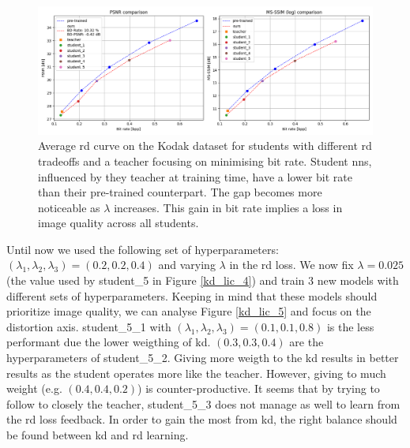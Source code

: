 \documentclass{article}
\begin{document}
\begin{figure}
    \centering
    \includegraphics[width=15cm]{kd_lic_rd_lambda_2.png}
    \caption[Average \acrshort{rd} curve on the Kodak dataset for students with different \acrshort{rd} tradeoffs and a teacher focusing on minimising bit rate.]{Average \acrshort{rd} curve on the Kodak dataset for students with different \acrshort{rd} tradeoffs and a teacher focusing on minimising bit rate. Student \acrshort{nn}s, influenced by they teacher at training time, have a lower bit rate than their pre-trained counterpart. The gap becomes more noticeable as \(\lambda\) increases. This gain in bit rate implies a loss in image quality across all students.}
    \label{kd_lic_4_bis}
\end{figure}

Until now we used the following set of hyperparameters: \((\lambda_{1}, \lambda_{2}, \lambda_{3}) = (0.2, 0.2, 0.4)\) and varying \(\lambda\) in the \acrshort{rd} loss. We now fix \(\lambda = 0.025\) (the value used by \textsf{student\_5} in Figure \ref{kd_lic_4}) and train 3 new models with different sets of hyperparameters. Keeping in mind that these models should prioritize image quality, we can analyse Figure \ref{kd_lic_5} and focus on the distortion axis. \textsf{student\_5\_1} with \((\lambda_{1}, \lambda_{2}, \lambda_{3}) = (0.1, 0.1, 0.8)\) is the less performant due the lower weigthing of \acrshort{kd}. \((0.3, 0.3, 0.4)\) are the hyperparameters of \textsf{student\_5\_2}. Giving more weigth to the \acrshort{kd} results in better results as the student operates more like the teacher. However, giving to much weight (e.g. \((0.4, 0.4, 0.2)\)) is counter-productive. It seems that by trying to follow to closely the teacher, \textsf{student\_5\_3} does not manage as well to learn from the \acrshort{rd} loss feedback. In order to gain the most from \acrshort{kd}, the right balance should be found between \acrshort{kd} and \acrshort{rd} learning.
\end{document}

